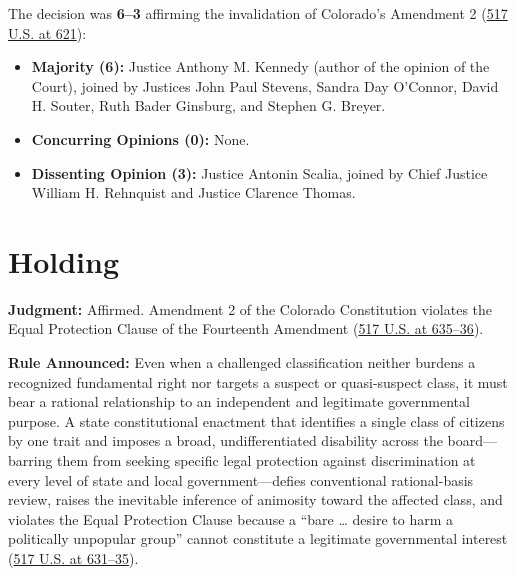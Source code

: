 \documentclass[12pt]{article}
\begin{document}
The decision was \textbf{6--3} affirming the invalidation of Colorado's Amendment 2 (\href{https://supreme.justia.com/cases/federal/us/517/620/}{517 U.S. at 621}):
\begin{itemize}
\item \textbf{Majority (6):} Justice Anthony M. Kennedy (author of the opinion of the Court), joined by Justices John Paul Stevens, Sandra Day O'Connor, David H. Souter, Ruth Bader Ginsburg, and Stephen G. Breyer.
\item \textbf{Concurring Opinions (0):} None.
\item \textbf{Dissenting Opinion (3):} Justice Antonin Scalia, joined by Chief Justice William H. Rehnquist and Justice Clarence Thomas.
\end{itemize}

\section{Holding}

\textbf{Judgment:} Affirmed. Amendment 2 of the Colorado Constitution violates the Equal Protection Clause of the Fourteenth Amendment (\href{https://supreme.justia.com/cases/federal/us/517/620/}{517 U.S. at 635--36}).

\textbf{Rule Announced:} Even when a challenged classification neither burdens a recognized fundamental right nor targets a suspect or quasi-suspect class, it must bear a rational relationship to an independent and legitimate governmental purpose. A state constitutional enactment that identifies a single class of citizens by one trait and imposes a broad, undifferentiated disability across the board---barring them from seeking specific legal protection against discrimination at every level of state and local government---defies conventional rational-basis review, raises the inevitable inference of animosity toward the affected class, and violates the Equal Protection Clause because a ``bare \dots{} desire to harm a politically unpopular group'' cannot constitute a legitimate governmental interest (\href{https://supreme.justia.com/cases/federal/us/517/620/}{517 U.S. at 631--35}).
\end{document}
